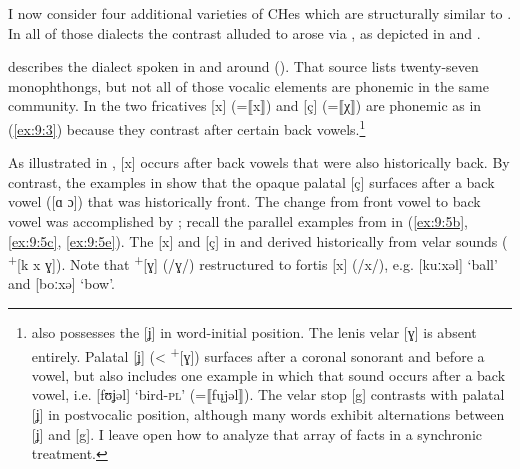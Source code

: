 I now consider four additional varieties of CHes which are structurally similar to . In all of those dialects the contrast alluded to arose via , as depicted in  and .\largerpage

\citet{Friebertshäuser1961} describes the dialect spoken in and around  (). That source lists twenty-seven monophthongs, but not all of those vocalic elements are phonemic in the same community. In  the two fricatives [x] (=⟦x⟧) and [ç] (=⟦χ⟧) are phonemic as in (\ref{ex:9:3}) because they contrast after certain back vowels.\footnote{\label{fn:9:6} also possesses the  [ʝ] in word-initial position. The lenis velar [ɣ] is absent entirely. Palatal [ʝ] (< \textsuperscript{+}[ɣ]) surfaces after a coronal sonorant and before a vowel, but \citet[24]{Friebertshäuser1961} also includes one example in which that sound occurs after a back vowel, i.e. [fʊʝəl] ‘bird-\textsc{pl}’ (=⟦f\k{u}jəl⟧). The velar stop [g] contrasts with palatal [ʝ] in postvocalic position, although many words exhibit alternations between [ʝ] and [g]. I leave open how to analyze that array of facts in a synchronic treatment.}

As illustrated in , [x] occurs after back vowels that were also historically back. By contrast, the examples in  show that the opaque palatal [ç] surfaces after a back vowel ([ɑ ɔ]) that was historically front. The change from front vowel to back vowel was accomplished by ; recall the parallel examples from  in (\ref{ex:9:5b}, \ref{ex:9:5c}, \ref{ex:9:5e}). The [x] and [ç] in  and  derived historically from velar sounds ( \textsuperscript{+}[k x ɣ]). Note that  \textsuperscript{+}[ɣ] (/ɣ/) restructured to fortis [x] (/x/), e.g. [kuːxəl] ‘ball’ and [boːxə] ‘bow’.


